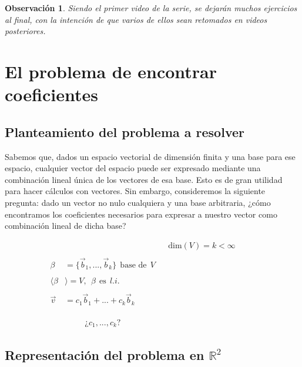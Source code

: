 \documentclass[12pt,dvipsnames]{article}
\newtheorem{obs}{Observación}[section]
\numberwithin{equation}{section}
\begin{document}
\begin{obs}
    Siendo el primer video de la serie, se dejarán muchos ejercicios al final, con la intención de que varios de ellos sean retomados en videos posteriores.
\end{obs}


\newpage
\section{El problema de encontrar coeficientes}

\subsection{Planteamiento del problema a resolver} \label{Ssec: Planteamiento del problema a resolver}

Sabemos que, dados un espacio vectorial de dimensión finita y una base para ese espacio, cualquier vector del espacio puede ser expresado mediante una combinación lineal única de los vectores de esa base. Esto es de gran utilidad para hacer cálculos con vectores. Sin embargo, consideremos la siguiente pregunta: dado un vector no nulo cualquiera y una base arbitraria, ¿cómo encontramos los coeficientes necesarios para expresar a nuestro vector como combinación lineal de dicha base?

\begin{align*}
    & & &\text{dim}(V)=k<\infty& & &\\
    \\
    \beta&=\{\vec{b}_1,...,\vec{b}_k\} \ \ \text{base de} \ \ V& & & & &\\
    \\
    \langle\beta&\rangle = V, \ \ \beta \ \ \text{es} \ \ l.i.& & & & & \\
    \\
    \vec{v}&= c_1\vec{b}_1 + ... + c_k\vec{b}_k& & & & & \\
    \\
    \\
    \\
    & \quad \quad \ \ \text{¿}c_1,...,c_k\text{?} & & & & &
\end{align*}

\subsection{Representación del problema en $\mathbb{R}^2$} \label{Ssec: Representación del problema en R^2}
\end{document}
